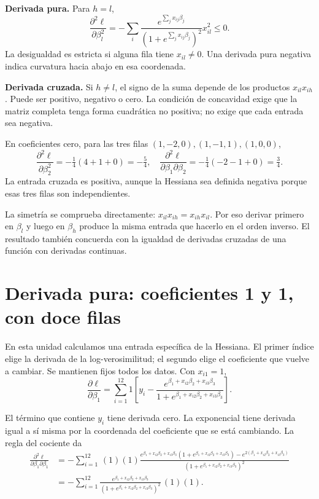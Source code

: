 \documentclass[11pt,a4paper]{article}
\begin{document}
\textbf{Derivada pura.}
Para $h=l$,
\[
\frac{\partial^2\ell}{\partial\beta_l^2}
=-\sum_i\frac{e^{\sum_jx_{ij}\beta_j}}
{(1+e^{\sum_jx_{ij}\beta_j})^2}x_{il}^2\le0.
\]
La desigualdad es estricta si alguna fila tiene $x_{il}\ne0$.
Una derivada pura negativa indica curvatura hacia abajo en esa coordenada.

\textbf{Derivada cruzada.}
Si $h\ne l$, el signo de la suma depende de los productos
$x_{il}x_{ih}$. Puede ser positivo, negativo o cero.
La condición de concavidad exige que la matriz completa tenga
forma cuadrática no positiva; no exige que cada entrada sea negativa.

\begin{ejemplo}
En coeficientes cero, para las tres filas
$(1,-2,0),(1,-1,1),(1,0,0)$,
\[
\frac{\partial^2\ell}{\partial\beta_2^2}
=-\tfrac14(4+1+0)=-\tfrac54,\quad
\frac{\partial^2\ell}{\partial\beta_1\partial\beta_2}
=-\tfrac14(-2-1+0)=\tfrac34.
\]
La entrada cruzada es positiva, aunque la Hessiana sea definida negativa
porque esas tres filas son independientes.
\end{ejemplo}
La simetría se comprueba directamente:
$x_{il}x_{ih}=x_{ih}x_{il}$.
Por eso derivar primero en $\beta_l$ y luego en $\beta_h$
produce la misma entrada que hacerlo en el orden inverso.
El resultado también concuerda con la igualdad de derivadas cruzadas
de una función con derivadas continuas.

\clearpage
\section{Derivada pura: coeficientes 1 y 1, con doce filas}\label{logit19}
En esta unidad calculamos una entrada específica de la Hessiana.
El primer índice elige la derivada de la log-verosimilitud; el segundo
elige el coeficiente que vuelve a cambiar.
Se mantienen fijos todos los datos. Con $x_{i1}=1$,
\[
\frac{\partial\ell}{\partial\beta_1}=\sum_{i=1}^{12}1\left[y_i-\frac{e^{\beta_1+x_{i2}\beta_2+x_{i3}\beta_3}}{1+e^{\beta_1+x_{i2}\beta_2+x_{i3}\beta_3}}\right].
\]

El término que contiene $y_i$ tiene derivada cero.
La exponencial tiene derivada igual a sí misma por la coordenada
del coeficiente que se está cambiando. La regla del cociente da
\[
\begin{aligned}
\frac{\partial^2\ell}{\partial\beta_1\partial\beta_1}&=-\sum_{i=1}^{12}\,(1)(1)\frac{e^{\beta_1+x_{i2}\beta_2+x_{i3}\beta_3}(1+e^{\beta_1+x_{i2}\beta_2+x_{i3}\beta_3})-e^{2(\beta_1+x_{i2}\beta_2+x_{i3}\beta_3)}}{(1+e^{\beta_1+x_{i2}\beta_2+x_{i3}\beta_3})^2}\\&=-\sum_{i=1}^{12}\frac{e^{\beta_1+x_{i2}\beta_2+x_{i3}\beta_3}}{(1+e^{\beta_1+x_{i2}\beta_2+x_{i3}\beta_3})^2}\,(1)(1).\end{aligned}
\]
\end{document}
